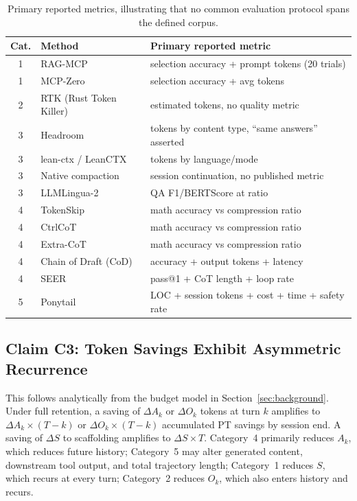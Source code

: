 \documentclass{article}
\begin{document}
\begin{table}[!htbp]
\caption{Primary reported metrics, illustrating that no common evaluation protocol spans the defined corpus.}
\label{tab:c2}
\centering
\footnotesize
\begin{tabularx}{\textwidth}{@{}clX@{}}
\toprule
Cat. & Method & Primary reported metric \\
\midrule
1 & RAG-MCP & selection accuracy + prompt tokens (20 trials) \\
1 & MCP-Zero & selection accuracy + avg tokens \\
\midrule
2 & RTK (Rust Token Killer) & estimated tokens, no quality metric \\
\midrule
3 & Headroom & tokens by content type, ``same answers'' asserted \\
3 & lean-ctx / LeanCTX & tokens by language/mode \\
3 & Native compaction & session continuation, no published metric \\
3 & LLMLingua-2 & QA F1/BERTScore at ratio \\
\midrule
4 & TokenSkip & math accuracy vs compression ratio \\
4 & CtrlCoT & math accuracy vs compression ratio \\
4 & Extra-CoT & math accuracy vs compression ratio \\
4 & Chain of Draft (CoD) & accuracy + output tokens + latency \\
4 & SEER & pass@1 + CoT length + loop rate \\
\midrule
5 & Ponytail & LOC + session tokens + cost + time + safety rate \\
\bottomrule
\end{tabularx}
\end{table}

\subsection{Claim C3: Token Savings Exhibit Asymmetric Recurrence}

This follows analytically from the budget model in Section~\ref{sec:background}. Under full retention, a saving of $\Delta A_k$ or $\Delta O_k$ tokens at turn $k$ amplifies to $\Delta A_k \times (T-k)$ or $\Delta O_k \times (T-k)$ accumulated PT savings by session end. A saving of $\Delta S$ to scaffolding amplifies to $\Delta S \times T$. Category~4 primarily reduces $A_k$, which reduces future history; Category~5 may alter generated content, downstream tool output, and total trajectory length; Category~1 reduces $S$, which recurs at every turn; Category~2 reduces $O_k$, which also enters history and recurs.
\end{document}
